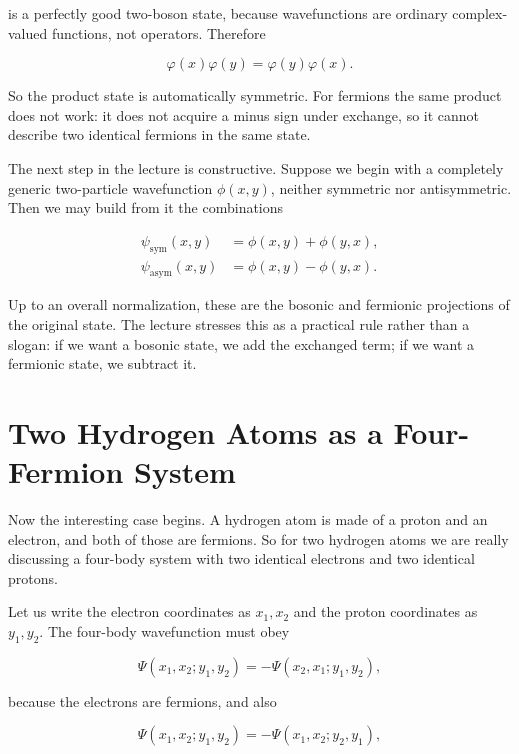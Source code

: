 is a perfectly good two-boson state, because wavefunctions are ordinary complex-valued functions, not operators. Therefore

\begin{equation}
\varphi(x)\varphi(y)=\varphi(y)\varphi(x).
\end{equation}

So the product state is automatically symmetric. For fermions the same product does not work: it does not acquire a minus sign under exchange, so it cannot describe two identical fermions in the same state.

The next step in the lecture is constructive. Suppose we begin with a completely generic two-particle wavefunction \(\phi(x,y)\), neither symmetric nor antisymmetric. Then we may build from it the combinations

\begin{align}
\psi_{\mathrm{sym}}(x,y) &= \phi(x,y)+\phi(y,x),\\
\psi_{\mathrm{asym}}(x,y) &= \phi(x,y)-\phi(y,x).
\end{align}

Up to an overall normalization, these are the bosonic and fermionic projections of the original state. The lecture stresses this as a practical rule rather than a slogan: if we want a bosonic state, we add the exchanged term; if we want a fermionic state, we subtract it.

\section{Two Hydrogen Atoms as a Four-Fermion System}

Now the interesting case begins. A hydrogen atom is made of a proton and an electron, and both of those are fermions. So for two hydrogen atoms we are really discussing a four-body system with two identical electrons and two identical protons.

Let us write the electron coordinates as \(x_1,x_2\) and the proton coordinates as \(y_1,y_2\). The four-body wavefunction must obey

\begin{equation}
\Psi(x_1,x_2;y_1,y_2)=-\Psi(x_2,x_1;y_1,y_2),
\end{equation}

because the electrons are fermions, and also

\begin{equation}
\Psi(x_1,x_2;y_1,y_2)=-\Psi(x_1,x_2;y_2,y_1),
\end{equation}

